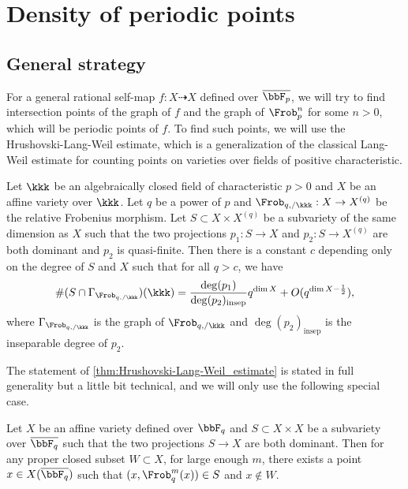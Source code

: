 \section{Density of periodic points}


\subsection{General strategy}

  
  For a general rational self-map $f: X \dashrightarrow X$ defined over $\overline{\bbF_p}$, we will try to find intersection points of the graph of $f$ and the graph of $\Frob_p^n$ for some $n > 0$, which will be periodic points of $f$.
  To find such points, we will use the Hrushovski-Lang-Weil estimate, which is a generalization of the classical Lang-Weil estimate for counting points on varieties over fields of positive characteristic.

  \begin{theorem}\label{thm:Hrushovski-Lang-Weil_estimate}
    Let $\kkk$ be an algebraically closed field of characteristic $p > 0$ and $X$ be an affine variety over $\kkk$.
    Let $q$ be a power of $p$ and $\Frob_{q,/\kkk}: X \to X^{(q)}$ be the relative Frobenius morphism.
    Let $S \subset X \times X^{(q)}$ be a subvariety of the same dimension as $X$ such that 
    the two projections $p_1: S \to X$ and $p_2: S \to X^{(q)}$ are both dominant and $p_2$ is quasi-finite.
    Then there is a constant $c$ depending only on the degree of $S$ and $X$ such that for all $q > c$, we have 
    \[ \# (S \cap \Gamma_{\Frob_{q,/\kkk}})(\kkk) = \frac{\deg(p_1)}{\deg(p_2)_{\mathrm{insep}}} q^{\dim X} + O(q^{\dim X - \frac{1}{2}}), \]
    where $\Gamma_{\Frob_{q,/\kkk}}$ is the graph of $\Frob_{q,/\kkk}$ and $\deg(p_2)_{\mathrm{insep}}$ is the inseparable degree of $p_2$.
  \end{theorem}

  The statement of \cref{thm:Hrushovski-Lang-Weil_estimate} is stated in full generality but a little bit technical, and we will only use the following special case.

  \begin{lemma}
    Let $X$ be an affine variety defined over $\bbF_q$ and $S \subset X \times X$ be a subvariety over $\overline{\bbF_q}$ such that the two projections $S \to X$ are both dominant.
    Then for any proper closed subset $W \subset X$, for large enough $m$, there exists a point $x \in X(\overline{\bbF_q})$ such that $(x, \Frob_q^m(x)) \in S$ and $x \notin W$.
  \end{lemma}

